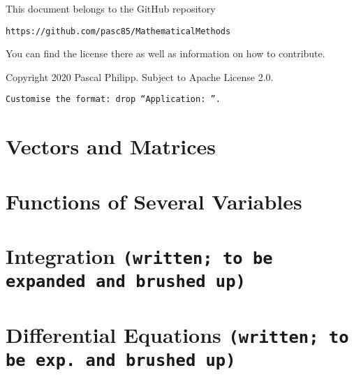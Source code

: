 \documentclass[12pt,a4paper]{report}
\theoremstyle{definition}
\begin{document}
\bigskip
This document belongs to the GitHub repository
\begin{center}
\texttt{https://github.com/pasc85/MathematicalMethods}
\end{center}
You can find the license there as well as information on how to contribute.

\vfill
\noindent
Copyright 2020 Pascal Philipp. Subject to Apache License 2.0.

\thispagestyle{empty}
\newpage
\restoregeometry

\tableofcontents
\thispagestyle{empty}
\newpage
\listoftheorems[ignoreall,show={application}]

\bigskip
\noindent
\texttt{Customise the format: drop ``Application: ''.}
\thispagestyle{empty}
\restoregeometry


\chapter{Vectors and Matrices}
\label{ch:vm}


\chapter{Functions of Several Variables}
\label{ch:fsv}


\chapter{Integration \texttt{(written; to be expanded and brushed up)}}
\label{ch:i}


\chapter{Differential Equations \texttt{(written; to be exp.~and brushed up)}}
\label{ch:de}


\printendnotes
\end{document}
